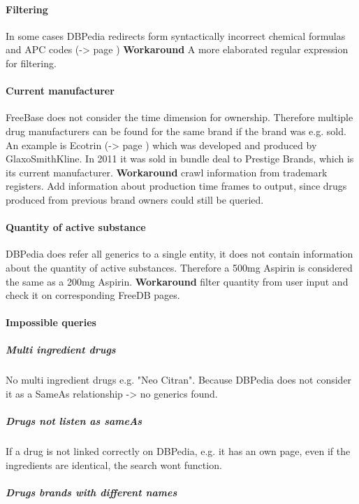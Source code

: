 \documentclass[11pt,titlepage,oneside,openany]{book}
\begin{document}
\paragraph{Filtering}
In some cases DBPedia redirects form syntactically incorrect chemical formulas and APC codes (-> page \pageref{sec:filtering}) \textbf{Workaround} A more elaborated regular expression for filtering.

\paragraph{Current manufacturer}
FreeBase does not consider the time dimension for ownership. Therefore multiple drug manufacturers can be found for the same brand if the brand was e.g. sold. An example is Ecotrin (-> page \pageref{ex:ecotrin}) which was developed and produced by GlaxoSmithKline. In 2011 it was sold in bundle deal to Prestige Brands, which is its current manufacturer.
\textbf{Workaround} crawl information from trademark registers. Add information about production time frames to output, since drugs produced from previous brand owners could still be queried.

\paragraph{Quantity of active substance}
DBPedia does refer all generics to a single entity, it does not contain information about the quantity of active substances. Therefore a 500mg Aspirin is considered the same as a 200mg Aspirin.
\textbf{Workaround} filter quantity from user input and check it on corresponding FreeDB pages.



\paragraph{Impossible queries}
\label{sec:drug_cocktail}
\subparagraph{Multi ingredient drugs} No multi ingredient drugs e.g. "Neo Citran". Because DBPedia does not consider it as a SameAs relationship -> no generics found.

\subparagraph{Drugs not listen as sameAs}
\label{sec:drug_sameAs}
If a drug is not linked correctly on DBPedia, e.g. it has an own page, even if the ingredients are identical, the search wont function.

\subparagraph{Drugs brands with different names}
\label{sec:drug_foregin_name}
\end{document}

